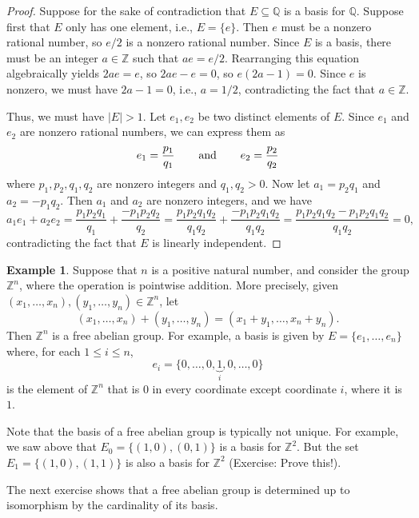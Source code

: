 \documentclass[a4paper]{memoir}
\theoremstyle{definition}
\newtheorem{example}[theorem]{Example}
\newcommand{\bb}{\mathbb}
\begin{document}
\begin{proof}
  Suppose for the sake of contradiction that $E \subseteq \bb{Q}$ is a basis for $\bb{Q}$. 
  Suppose first that $E$ only has one element, i.e., $E = \{e\}$. Then $e$ must be a nonzero 
  rational number, so $e/2$ is a nonzero rational number. Since $E$ is a basis, there must be 
  an integer $a \in \bb{Z}$ such that $ae = e/2$. Rearranging this equation algebraically yields
  $2ae = e$, so $2ae - e = 0$, so $e(2a - 1) = 0$. Since $e$ is nonzero, we must have 
  $2a - 1 = 0$, i.e., $a = 1/2$, contradicting the fact that $a \in \bb{Z}$. 
  
  Thus, we must have $|E| > 1$. Let $e_1, e_2$ be two distinct elements of $E$. Since $e_1$ 
  and $e_2$ are nonzero rational numbers, we can express them as 
  \[
    e_1 = \frac{p_1}{q_1} \hspace{0.25in} \text{ and } \hspace{0.25in} e_2 = \frac{p_2}{q_2}
  \]
  where $p_1, p_2, q_1, q_2$ are nonzero integers and $q_1,q_2 > 0$. Now let 
  $a_1 = p_2q_1$ and $a_2 = -p_1q_2$. Then $a_1$ and $a_2$ are nonzero integers, and we have
  \[
    a_1e_1 + a_2e_2 = \frac{p_1p_2q_1}{q_1} + \frac{-p_1p_2q_2}{q_2} = 
    \frac{p_1p_2q_1q_2}{q_1q_2} + \frac{-p_1p_2q_1q_2}{q_1q_2} = 
    \frac{p_1p_2q_1q_2 - p_1p_2q_1q_2}{q_1q_2} = 0,
  \]
  contradicting the fact that $E$ is linearly independent.
\end{proof}

\begin{example}
  Suppose that $n$ is a positive natural number, and consider the group 
  $\bb{Z}^n$, where the operation is pointwise addition. More precisely, given 
  $(x_1, \ldots, x_n), (y_1, \ldots, y_n) \in \bb{Z}^n$, let 
  \[
    (x_1, \ldots, x_n) + (y_1, \ldots, y_n) = (x_1 + y_1, \ldots, x_n + y_n).
  \]
  Then $\bb{Z}^n$ is a free abelian group. For example, a basis is given by 
  $E = \{e_1, \ldots, e_n\}$ where, for each $1 \leq i \leq n$, 
  \[
    e_i = \{0, \ldots, 0, \underbrace{1}_{i},0, \ldots, 0\}
  \]
  is the element of $\bb{Z}^n$ that is $0$ in every coordinate except coordinate $i$, 
  where it is $1$.
  
  Note that the basis of a free abelian group is typically not unique. For example, 
  we saw above that $E_0 = \{(1,0), (0,1)\}$ is a basis for $\bb{Z}^2$. But the set 
  $E_1 = \{(1,0), (1,1)\}$ is also a basis for $\bb{Z}^2$ (Exercise: Prove this!).
\end{example}

The next exercise shows that a free abelian group is determined up to isomorphism by 
the cardinality of its basis.
\end{document}
